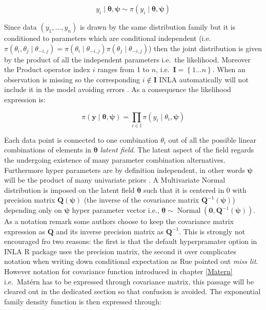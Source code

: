\documentclass[
  12pt,
  a4paper,
  oneside]{book}
\theoremstyle{definition}
\theoremstyle{definition}
\theoremstyle{definition}
\theoremstyle{remark}
\begin{document}
\[
y_{i} \mid \boldsymbol{\theta}, \boldsymbol{\psi} \sim \pi\left(y_{i} \mid \boldsymbol{\theta},\boldsymbol{\psi}\right)
\]

Since data \(\left(y_{1}, \ldots, y_{n}\right)\) is drawn by the same distribution family but it is conditioned to parameters which are conditional independent (i.e.~\(\pi\left(\theta_{i}, \theta_{j} \mid \theta_{-i, j}\right)=\pi\left(\theta_{i} \mid \theta_{-i, j}\right) \pi\left(\theta_{j} \mid \theta_{-i, j}\right)\)) \citep{GMRFRue} then the joint distribution is given by the product of all the independent parameters i.e.~the likelihood. Moreover the Product operator index \(i\) ranges from 1 to \(n\), i.e.~\(\mathbf{I} = \left\{1 \ldots n \right\}\). When an observation is missing so the corresponding \(i \notin \mathbf{I}\) INLA automatically will not include it in the model avoiding errors \citeyearpar{Bayesian_INLA_Rubio}. As a consequence the likelihood expression is:

\begin{equation}
\pi(\boldsymbol{y} \mid \boldsymbol{\theta}, \boldsymbol{\psi})=\prod_{i \in \mathbb{I}} \pi\left(y_{i} \mid \theta_{i}, \boldsymbol{\psi}\right)
\label{eq:likelihood}
\end{equation}

Each data point is connected to one combination \(\theta_{i}\) out of all the possible linear combinations of elements in \(\boldsymbol{\theta}\) \emph{latent field}. The latent aspect of the field regards the undergoing existence of many parameter combination alternatives. Furthermore hyper parameters are by definition independent, in other words \(\boldsymbol{\psi}\) will be the product of many univariate priors \citep{Bayesian_INLA_Rubio}. A Multivariate Normal distribution is imposed on the latent field \(\boldsymbol{\theta}\) such that it is centered in 0 with precision matrix \(\boldsymbol{Q(\psi)}\) (the inverse of the covariance matrix \(\boldsymbol{Q}^{-1}(\boldsymbol{\psi})\)) depending only on \(\boldsymbol{\psi}\) hyper parameter vector i.e., \(\boldsymbol{\theta} \sim \operatorname{Normal}\left(\mathbf{0}, \boldsymbol{Q}^{-1}(\boldsymbol{\psi})\right)\). As a notation remark some authors choose to keep the covariance matrix expression as \(\boldsymbol{Q}\) and its inverse precision matrix as \(\boldsymbol{Q}^{-1}\). This is strongly not encouraged fro two reasons: the first is that the default hyperpramater option in INLA R package uses the precision matrix, the second it over complicates notation when writing down conditional expectation as Rue pointed out \emph{miss lit}. However notation for covariance function introduced in chapter \ref{Matern} i.e.~Matérn has to be expressed through covariance matrix, this passage will be cleared out in the dedicated section so that confusion is avoided.
The exponential family density function is then expressed through:
\end{document}
